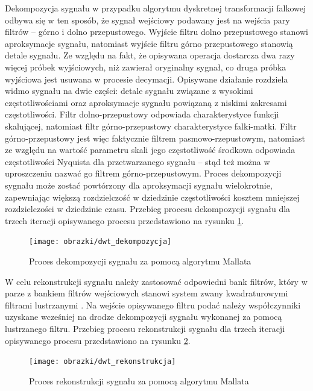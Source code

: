 Dekompozycja sygnału w przypadku algorytmu dyskretnej transformacji falkowej odbywa się w ten sposób, że sygnał wejściowy podawany jest na wejścia pary filtrów -- górno i dolno przepustowego. Wyjście filtru dolno przepustowego stanowi aproksymacje sygnału, natomiast wyjście filtru górno przepustowego stanowią detale sygnału. Ze względu na fakt, że opisywana operacja dostarcza dwa razy więcej próbek wyjściowych, niż zawierał oryginalny sygnał, co druga próbka wyjściowa jest usuwana w procesie decymacji. Opisywane działanie rozdziela widmo sygnału na dwie części: detale sygnału związane z wysokimi częstotliwościami oraz aproksymacje sygnału powiązaną z niskimi zakresami częstotliwości. Filtr dolno-przepustowy odpowiada charakterystyce funkcji skalującej, natomiast filtr górno-przepustowy charakterystyce falki-matki. Filtr górno-przepustowy jest więc faktycznie filtrem pasmowo-rzepustowym, natomiast ze względu na wartość parametru skali jego częstotliwość środkowa odpowiada częstotliwości Nyquista dla przetwarzanego sygnału -- stąd też można w uproszczeniu nazwać go filtrem górno-przepustowym. Proces dekompozycji sygnału może zostać powtórzony dla aproksymacji sygnału wielokrotnie, zapewniając większą rozdzielczość w dziedzinie częstotliwości kosztem mniejszej rozdzielczości w dziedzinie czasu. Przebieg procesu dekompozycji sygnału dla trzech iteracji opisywanego procesu przedstawiono na rysunku \ref{fig_dwt_decomposition}.

\begin{figure}[htb!]
\begin{center}
\texttt{[image: obrazki/dwt\_dekompozycja]}
\caption{Proces dekompozycji sygnału za pomocą algorytmu Mallata \label{fig_dwt_decomposition}}
\end{center}
\end{figure}

W celu rekonstrukcji sygnału należy zastosować odpowiedni bank filtrów, który w parze z bankiem filtrów wejściowych stanowi system zwany kwadraturowymi filtrami lustrzanymi \cite{johnston_filter}. Na wejście opisywanego filtru podać należy współczynniki uzyskane wcześniej na drodze dekompozycji sygnału wykonanej za pomocą lustrzanego filtru. Przebieg procesu rekonstrukcji sygnału dla trzech iteracji opisywanego procesu przedstawiono na rysunku \ref{fig_dwt_reconstruction}.

\begin{figure}[htb!]
\begin{center}
\texttt{[image: obrazki/dwt\_rekonstrukcja]}
\caption{Proces rekonstrukcji sygnału za pomocą algorytmu Mallata \label{fig_dwt_reconstruction}}
\end{center}
\end{figure}

